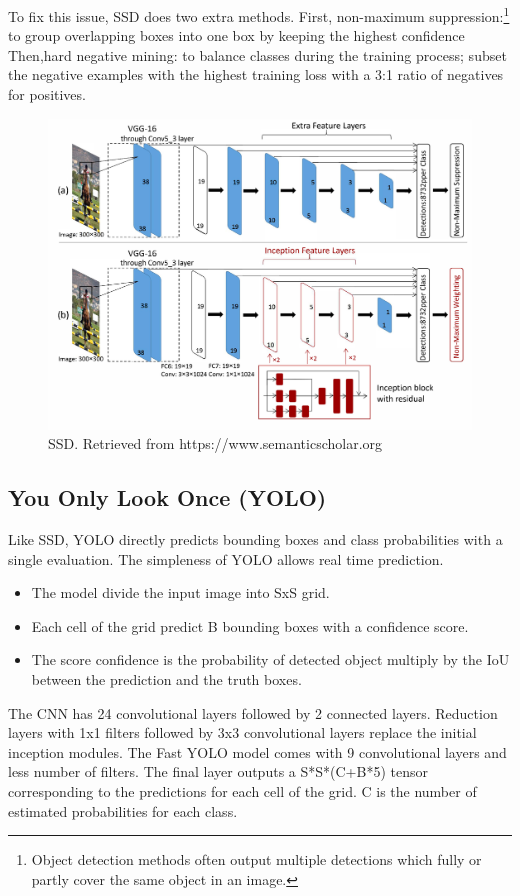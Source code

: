 \documentclass[12pt]{report}
\begin{document}
To fix this issue, SSD does two extra methods.
First, non-maximum suppression:\footnote{Object detection methods often output multiple detections which fully or partly cover the same object in an image.}
to group overlapping boxes into one box by keeping the highest confidence
Then,hard negative mining: to balance classes during the training process; subset the negative examples 
with the highest training loss with a 3:1 ratio of negatives for positives.\cite{Liu2016}

\begin{figure}[h]
    \centering
    \includegraphics[width=.7\textwidth]{./images/ssd.png}
    \caption{SSD. Retrieved from https://www.semanticscholar.org}
    \label{fig:frcnn}
\end{figure} 



\subsection{You Only Look Once (YOLO)}

Like SSD, YOLO directly predicts bounding boxes and class probabilities
with a single evaluation. The simpleness of YOLO allows real time prediction.
\begin{itemize}
    \item The model divide the input image into SxS grid.
    \item Each cell of the grid predict B bounding boxes with a confidence score.
    \item The score confidence is the probability of detected object multiply by the IoU between the prediction and the truth boxes.
\end{itemize}
The CNN has 24 convolutional layers followed by 2 connected layers.
Reduction layers with 1x1 filters followed by 3x3 convolutional layers 
replace the initial inception modules.
\bigbreak
The Fast YOLO model comes with 9  convolutional layers and less number of filters.
The final layer outputs a S*S*(C+B*5) tensor corresponding to the predictions for each cell of the grid.
C is the number of estimated probabilities for each class.
\end{document}
